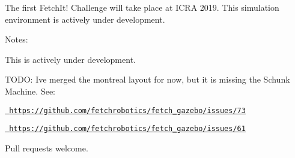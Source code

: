 The first Fetch\+It! Challenge will take place at I\+C\+RA 2019. This simulation environment is actively under development.

Notes\+:

This is actively under development.

T\+O\+DO\+: I\textquotesingle{}ve merged the montreal layout for now, but it is missing the Schunk Machine. See\+:


\begin{DoxyEnumerate}
\item \href{https://github.com/fetchrobotics/fetch_gazebo/issues/73}{\texttt{ https\+://github.\+com/fetchrobotics/fetch\+\_\+gazebo/issues/73}}
\item \href{https://github.com/fetchrobotics/fetch_gazebo/issues/61}{\texttt{ https\+://github.\+com/fetchrobotics/fetch\+\_\+gazebo/issues/61}}
\end{DoxyEnumerate}

Pull requests welcome. 